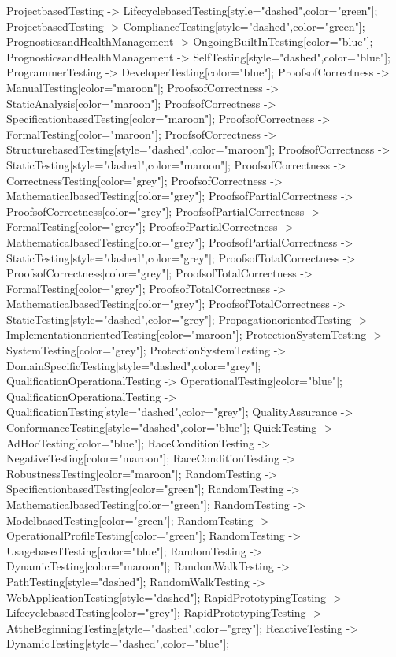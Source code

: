 \documentclass{article}
\begin{document}
{ProjectbasedTesting -> LifecyclebasedTesting[style="dashed",color="green"];
ProjectbasedTesting -> ComplianceTesting[style="dashed",color="green"];
PrognosticsandHealthManagement -> OngoingBuiltInTesting[color="blue"];
PrognosticsandHealthManagement -> SelfTesting[style="dashed",color="blue"];
ProgrammerTesting -> DeveloperTesting[color="blue"];
ProofsofCorrectness -> ManualTesting[color="maroon"];
ProofsofCorrectness -> StaticAnalysis[color="maroon"];
ProofsofCorrectness -> SpecificationbasedTesting[color="maroon"];
ProofsofCorrectness -> FormalTesting[color="maroon"];
ProofsofCorrectness -> StructurebasedTesting[style="dashed",color="maroon"];
ProofsofCorrectness -> StaticTesting[style="dashed",color="maroon"];
ProofsofCorrectness -> CorrectnessTesting[color="grey"];
ProofsofCorrectness -> MathematicalbasedTesting[color="grey"];
ProofsofPartialCorrectness -> ProofsofCorrectness[color="grey"];
ProofsofPartialCorrectness -> FormalTesting[color="grey"];
ProofsofPartialCorrectness -> MathematicalbasedTesting[color="grey"];
ProofsofPartialCorrectness -> StaticTesting[style="dashed",color="grey"];
ProofsofTotalCorrectness -> ProofsofCorrectness[color="grey"];
ProofsofTotalCorrectness -> FormalTesting[color="grey"];
ProofsofTotalCorrectness -> MathematicalbasedTesting[color="grey"];
ProofsofTotalCorrectness -> StaticTesting[style="dashed",color="grey"];
PropagationorientedTesting -> ImplementationorientedTesting[color="maroon"];
ProtectionSystemTesting -> SystemTesting[color="grey"];
ProtectionSystemTesting -> DomainSpecificTesting[style="dashed",color="grey"];
QualificationOperationalTesting -> OperationalTesting[color="blue"];
QualificationOperationalTesting -> QualificationTesting[style="dashed",color="grey"];
QualityAssurance -> ConformanceTesting[style="dashed",color="blue"];
QuickTesting -> AdHocTesting[color="blue"];
RaceConditionTesting -> NegativeTesting[color="maroon"];
RaceConditionTesting -> RobustnessTesting[color="maroon"];
RandomTesting -> SpecificationbasedTesting[color="green"];
RandomTesting -> MathematicalbasedTesting[color="green"];
RandomTesting -> ModelbasedTesting[color="green"];
RandomTesting -> OperationalProfileTesting[color="green"];
RandomTesting -> UsagebasedTesting[color="blue"];
RandomTesting -> DynamicTesting[color="maroon"];
RandomWalkTesting -> PathTesting[style="dashed"];
RandomWalkTesting -> WebApplicationTesting[style="dashed"];
RapidPrototypingTesting -> LifecyclebasedTesting[color="grey"];
RapidPrototypingTesting -> AttheBeginningTesting[style="dashed",color="grey"];
ReactiveTesting -> DynamicTesting[style="dashed",color="blue"];
}
\end{document}
